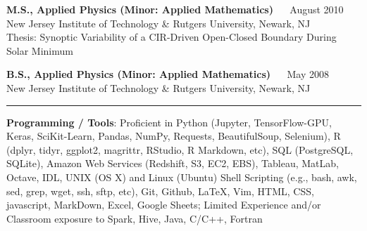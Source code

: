 \documentclass[10pt]{article}
\newcommand{\ressection}[1]{\noindent{\large\textbf{#1}}
\vspace{2pt}\hrule\vspace{4pt}}
\newcommand{\leftandright}[2]{\noindent\textbf{#1}\hfill
\textbf{#2}}
\begin{document}
\leftandright{M.S., Applied Physics (Minor: Applied Mathematics)}{$\quad$} {August 2010} \\  
\indent New Jersey Institute of Technology \& Rutgers University, Newark, NJ\\  
\indent Thesis: Synoptic Variability of a CIR-Driven Open-Closed Boundary During Solar Minimum


\leftandright{B.S., Applied Physics (Minor: Applied Mathematics)}{$\quad$} {May 2008} \\  
\indent New Jersey Institute of Technology \& Rutgers University, Newark, NJ\\  




\vspace{0.5cm}
\ressection{Computing Skills}
\noindent\textbf{Programming / Tools}: Proficient in Python  
(Jupyter, TensorFlow-GPU, Keras, SciKit-Learn, Pandas, NumPy, Requests,
BeautifulSoup, Selenium), R (dplyr, tidyr,
ggplot2, magrittr, RStudio, R Markdown, etc), SQL (PostgreSQL, SQLite),
Amazon Web Services (Redshift, S3, EC2, EBS), Tableau, MatLab, Octave, IDL, 
UNIX (OS X) and Linux (Ubuntu) Shell Scripting (e.g., bash, awk, sed,
grep, wget, ssh, sftp, etc), Git, Github, 
LaTeX, Vim, HTML, CSS, javascript, MarkDown, Excel, Google Sheets; 
Limited Experience and/or Classroom exposure to Spark, Hive, Java, C/C++, Fortran
  \vspace{0.1in}
\end{document}
